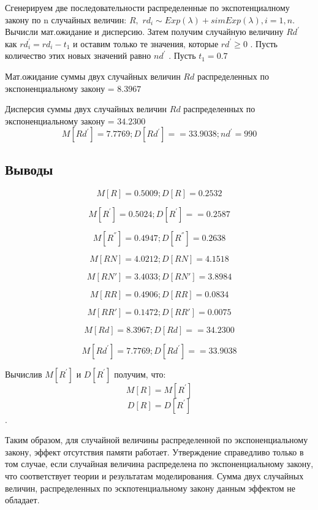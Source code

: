 Сгенерируем две последовательности распределенные по
экспотенциалному закону по n случайных величин:  $R,$
$rd_{i}\sim Exp(\lambda)+sim Exp(\lambda),i=1,n$.
Вычисли мат.ожидание и дисперсию. Затем получим случайную величину $Rd^{'}$ как
$rd_{i}^{'}=rd_{i}-t_{1}$ и оставим только те значения, которые $rd^{'}\geq0$ .
Пусть количество этих новых значений равно $nd^{'}$ . Пусть $t_{1}=0.7$

Мат.ожидание суммы двух случайных величин $ Rd $ распределенных по
экспоненциальному закону = $ 8.3967  $

Дисперсия суммы двух случайных величин $ Rd $ распределенных по
экспоненциальному закону = $ 34.2300 $ 
\[ M[Rd^{'}]= 7.7769; D[Rd^{'}]= = 33.9038; nd^{'}= 990 \]
 

\subsection{Выводы}

\[ M[R]= 0.5009; D[R]= 0.2532  \]


\[ M[R^{'}]= 0.5024; D[R^{'}]= = 0.2587 \]


\[ M[R^{''}]= 0.4947; D[R^{''}]= 0.2638 \]


\[ M[RN]= 4.0212; D[RN]=4.1518 \]


\[ M[RN']= 3.4033; D[RN']= 3.8984 \]


\[ M[RR]= 0.4906; D[RR]= 0.0834 \]


\[ M[RR']= 0.1472; D[RR']= 0.0075 \]

\[ M[Rd]= 8.3967; D[Rd]= = 34.2300 \]

\[ M[Rd^{'}]= 7.7769; D[Rd^{'}]= = 33.9038 \]

Вычислив $M[R^{'}]$ и $D[R^{'}]$ получим,
что: 
\[ M[R]=M[R^{'}]\]
\[D[R]=D[R^{'}] \]. 

Таким образом, для случайной величины распределенной по экспоненциальному
закону, эффект отсутствия памяти работает. Утверждение справедливо
только в том случае, если случайная величина распределена по экспоненциальному
закону, что соответствует теории и результатам моделирования. Сумма двух
случайных величин, распределенных по эскпотенциальному закону данным эффектом не
обладает.

%
\newpage